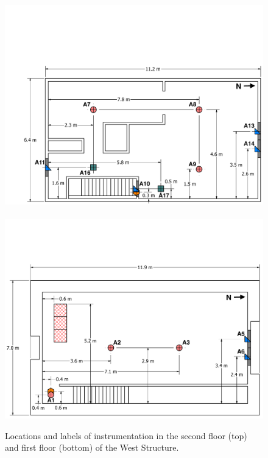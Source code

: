 \begin{figure}[!ht]
	\centering
	\includegraphics[width=0.94\columnwidth]{Figures/Floor_Plans/West_Structure_2nd_Floor_Dimensioned_Instrumentation}
	\\~\\
	\includegraphics[width=\columnwidth]{Figures/Floor_Plans/West_Structure_1st_Floor_Dimensioned_Instrumentation}
	\caption[Locations and labels of instrumentation in the West Structure.]{Locations and labels of instrumentation in the second floor (top) and first floor (bottom) of the West Structure.}
	\label{fig:west_instrumentation}
\end{figure}



